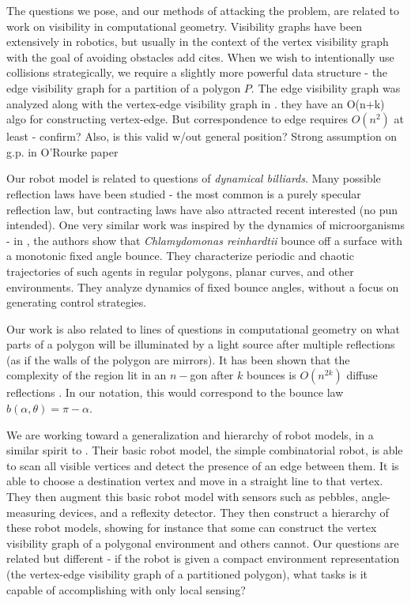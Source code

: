 \documentclass[]{svproc}  %
\begin{document}
The questions we pose, and our methods of attacking the problem, are related to
work on visibility in computational geometry. Visibility graphs have been
extensively in robotics, but usually in the context of the vertex visibility
graph with the goal of avoiding obstacles {\color{red} add cites}. When we wish
to intentionally use collisions strategically, we require a slightly more
powerful data structure - the edge visibility graph for a partition of a polygon
$P$. The edge visibility graph was analyzed along with the vertex-edge
visibility graph in \cite{rourke_viz}. {\color{red} they have an O(n+k) algo for
constructing vertex-edge. But correspondence to edge requires $O(n^2)$ at least
- confirm? Also, is this valid w/out general position? Strong assumption on g.p.
in O'Rourke paper}

Our robot model is related to questions of \emph{dynamical billiards}. Many 
possible reflection laws have been studied -
the most common is a purely specular reflection law, but contracting laws have
also attracted recent interested \cite{DelMagno2014,billiards,pinball} (no pun intended). 
One very similar work was inspired by the dynamics of microorganisms - in \cite{microorganism2017}, 
the authors show that 
\textit{Chlamydomonas reinhardtii} bounce off a surface with a
monotonic fixed angle bounce. They characterize periodic and
chaotic trajectories of such agents in regular polygons, planar curves, and other environments.
They analyze dynamics of fixed bounce angles, without a focus on generating control
strategies.

Our work is also related to lines of questions in computational geometry on what
parts of a polygon will be illuminated by a light source after multiple
reflections (as if the walls of the polygon are mirrors). It has been shown that
the complexity of the region lit in an $n-$gon after $k$ bounces is $O(n^{2k})$
{\color{red} diffuse reflections} \cite{Aronov1996,prasad1998visibility}. In our
notation, this would correspond to the bounce law
$b(\alpha, \theta) = \pi - \alpha$.

We are working toward a generalization and hierarchy of robot models, in a
similar spirit to \cite{brunner2008simple}. Their basic robot model, the simple
combinatorial robot, is able to scan all visible vertices and detect the
presence of an edge between them. It is able to choose a destination vertex and
move in a straight line to that vertex. They then augment this basic robot model
with sensors such as pebbles, angle-measuring devices, and a reflexity detector.
They then construct a hierarchy of these robot models, showing for instance that
some can construct the vertex visibility graph of a polygonal environment
and others cannot. Our questions are related but different - if the robot is
given a compact environment representation (the vertex-edge visibility graph of a
partitioned polygon), what tasks is it capable of accomplishing with only local
sensing?
\end{document}
